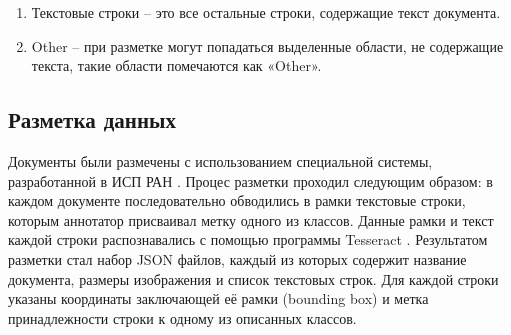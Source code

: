 \documentclass{ProcISPRAS}
\begin{document}
\begin{enumerate}
\begin{itemize}
		\item если элемент списка визуально занимает несколько строк, все строки кроме первой помечаются как текст. Также к списку не относятся строки, помеченные как заголовок (выделенные шрифтом, жирностью и т. д.).
		
		На рис. \ref{fig:4} как элемент списка будут помечены только две строки, остальные помечаются как текст.
		
		\begin{figure}[t]
		    \label{fig:4}
		\end{figure}
		
	\end{itemize}
	
	\item Текстовые строки -- это все остальные строки, содержащие текст документа.
	\item Other -- при разметке могут попадаться выделенные области, не содержащие текста, такие области помечаются как «Other».
	
\end{enumerate}

\subsection{Разметка данных}

Документы были размечены с использованием специальной системы, разработанной в ИСП РАН \cite{labeler}. Процес разметки проходил следующим образом: в каждом документе последовательно обводились в рамки текстовые строки, которым аннотатор присваивал метку одного из классов. Данные рамки и текст каждой строки распознавались с помощью программы Tesseract \cite{tesseract}.  Результатом разметки стал набор JSON файлов, каждый из которых содержит название документа, размеры изображения и список текстовых строк. Для каждой строки указаны координаты заключающей её рамки (bounding box) и метка принадлежности строки к одному из описанных классов.
\end{document}
